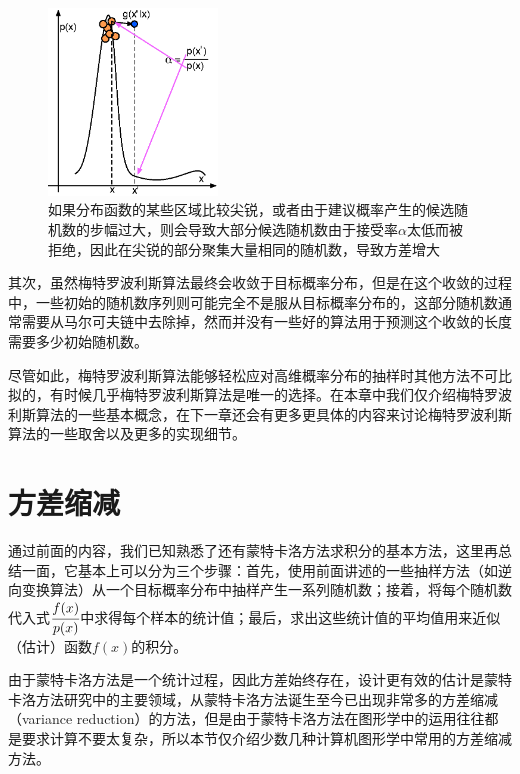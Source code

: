 \begin{figure}
	\sidecaption
	\includegraphics[width=0.4\textwidth]{figures/mc/metropolis-1}
	\caption{如果分布函数的某些区域比较尖锐，或者由于建议概率产生的候选随机数的步幅过大，则会导致大部分候选随机数由于接受率$\alpha$太低而被拒绝，因此在尖锐的部分聚集大量相同的随机数，导致方差增大}
	\label{f:mc-met-1}
\end{figure}

其次，虽然梅特罗波利斯算法最终会收敛于目标概率分布，但是在这个收敛的过程中，一些初始的随机数序列则可能完全不是服从目标概率分布的，这部分随机数通常需要从马尔可夫链中去除掉，然而并没有一些好的算法用于预测这个收敛的长度需要多少初始随机数。

尽管如此，梅特罗波利斯算法能够轻松应对高维概率分布的抽样时其他方法不可比拟的，有时候几乎梅特罗波利斯算法是唯一的选择。在本章中我们仅介绍梅特罗波利斯算法的一些基本概念，在下一章还会有更多更具体的内容来讨论梅特罗波利斯算法的一些取舍以及更多的实现细节。





\section{方差缩减}\label{sec:Variance-Reduction}
通过前面的内容，我们已知熟悉了还有蒙特卡洛方法求积分的基本方法，这里再总结一面，它基本上可以分为三个步骤：首先，使用前面讲述的一些抽样方法（如逆向变换算法）从一个目标概率分布中抽样产生一系列随机数；接着，将每个随机数代入式$ \cfrac{f(x)}{p(x)}$中求得每个样本的统计值；最后，求出这些统计值的平均值用来近似（估计）函数$f(x)$的积分。

由于蒙特卡洛方法是一个统计过程，因此方差始终存在，设计更有效的估计是蒙特卡洛方法研究中的主要领域，从蒙特卡洛方法诞生至今已出现非常多的方差缩减（variance reduction）的方法，但是由于蒙特卡洛方法在图形学中的运用往往都是要求计算不要太复杂，所以本节仅介绍少数几种计算机图形学中常用的方差缩减方法。





